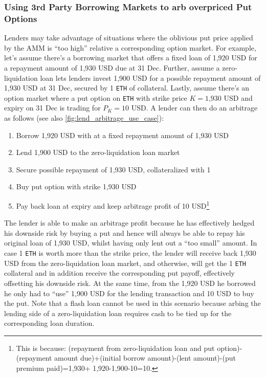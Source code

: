 \documentclass[a4paper]{article}
\begin{document}
\subsubsection{Using 3rd Party Borrowing Markets to arb overpriced Put Options}
Lenders may take advantage of situations where the oblivious put price applied by the AMM is ``too high'' relative a corresponding option market. For example, let's assume there's a borrowing market that offers a fixed loan of 1,920 USD for a repayment amount of 1,930 USD due at 31 Dec. Further, assume a zero-liquidation loan lets lenders invest 1,900 USD for a possible repayment amount of 1,930 USD at 31 Dec, secured by 1 \verb|ETH| of collateral. Lastly, assume there's an option market where a put option on \verb|ETH| with strike price $K=\textrm{1,930 USD}$ and expiry on 31 Dec is trading for $P_K=\textrm{10 USD}$. A lender can then do an arbitrage as follows (see also \cref{fig:lend_arbitrage_use_case}):
\begin{enumerate}
\item Borrow 1,920 USD with at a fixed repayment amount of 1,930 USD
\item Lend 1,900 USD to the zero-liquidation loan market
\item Secure possible repayment of 1,930 USD, collateralized with 1 
\item Buy put option with strike 1,930 USD
\item Pay back loan at expiry and keep arbitrage profit of 10 USD\footnote{This is because: (repayment from zero-liquidation loan and put option)-(repayment amount due)+(initial borrow amount)-(lent amount)-(put premium paid)=1,930+ 1,920-1,900-10=10.}
\end{enumerate}
The lender is able to make an arbitrage profit because he has effectively hedged his downside risk by buying a put and hence will always be able to repay his original loan of 1,930 USD, whilst having only lent out a ``too small'' amount. In case 1 \verb|ETH| is worth more than the strike price, the lender will receive back 1,930 USD from the zero-liquidation loan market, and otherwise, will get the 1 \verb|ETH| collateral and in addition receive the corresponding put payoff, effectively offsetting his downside risk. At the same time, from the 1,920 USD he borrowed he only had to ``use'' 1,900 USD for the lending transaction and 10 USD to buy the put. Note that a flash loan cannot be used in this scenario because arbing the lending side of a zero-liquidation loan requires cash to be tied up for the corresponding loan duration.
\end{document}
